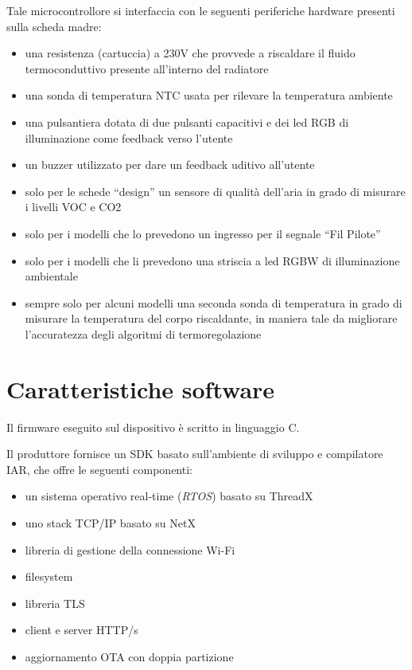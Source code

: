 \documentclass[12pt,a4paper,twoside,titlepage]{book}
\begin{document}
Tale microcontrollore si interfaccia con le seguenti periferiche hardware presenti
sulla scheda madre:

\begin{itemize}
    \item una resistenza (cartuccia) a 230V che provvede a riscaldare il fluido
        termoconduttivo presente all'interno del radiatore
    \item una sonda di temperatura NTC usata per rilevare la temperatura ambiente
    \item una pulsantiera dotata di due pulsanti capacitivi e dei led RGB di illuminazione
        come feedback verso l'utente
    \item un buzzer utilizzato per dare un feedback uditivo all'utente
    \item solo per le schede ``design'' un sensore di qualità dell'aria in grado di
        misurare i livelli VOC e CO2
    \item solo per i modelli che lo prevedono un ingresso per il segnale ``Fil Pilote''
    \item solo per i modelli che li prevedono una striscia a led RGBW di illuminazione ambientale
    \item sempre solo per alcuni modelli una seconda sonda di temperatura in grado di
        misurare la temperatura del corpo riscaldante, in maniera tale da migliorare
        l'accuratezza degli algoritmi di termoregolazione
\end{itemize}

\section{Caratteristiche software}

Il firmware eseguito sul dispositivo è scritto in linguaggio C.

Il produttore fornisce un SDK basato sull'ambiente di sviluppo e compilatore IAR,
che offre le seguenti componenti:

\begin{itemize}
    \item un sistema operativo real-time (\textit{RTOS}) basato su ThreadX
    \item uno stack TCP/IP basato su NetX
    \item libreria di gestione della connessione Wi-Fi
    \item filesystem
    \item libreria TLS
    \item client e server HTTP/s
    \item aggiornamento OTA con doppia partizione
\end{itemize}
\end{document}
